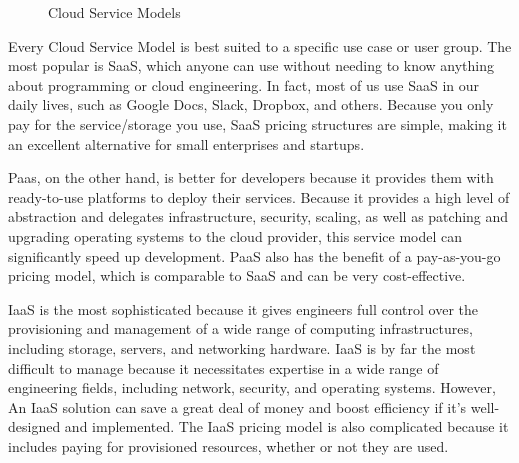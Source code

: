 \begin{figure}[!h]
    \centering
    \caption{Cloud Service Models}
    \label{fig:cloudmodels}
\end{figure}

\qquad Every Cloud Service Model is best suited to a specific use case or user group. The most popular is SaaS, which anyone can use without needing to know anything about programming or cloud engineering. In fact, most of us use SaaS in our daily lives, such as Google Docs, Slack, Dropbox, and others. Because you only pay for the service/storage you use, SaaS pricing structures are simple, making it an excellent alternative for small enterprises and startups.

\qquad Paas, on the other hand, is better for developers because it provides them with ready-to-use platforms to deploy their services. Because it provides a high level of abstraction and delegates infrastructure, security, scaling, as well as patching and upgrading operating systems to the cloud provider, this service model can significantly speed up development. PaaS also has the benefit of a pay-as-you-go pricing model, which is comparable to SaaS and can be very cost-effective.   

\qquad IaaS is the most sophisticated because it gives engineers full control over the provisioning and management of a wide range of computing infrastructures, including storage, servers, and networking hardware. IaaS is by far the most difficult to manage because it necessitates expertise in a wide range of engineering fields, including network, security, and operating systems. However, An IaaS solution can save a great deal of money and boost efficiency if it's well-designed and implemented. The IaaS pricing model is also complicated because it includes paying for provisioned resources, whether or not they are used. 


